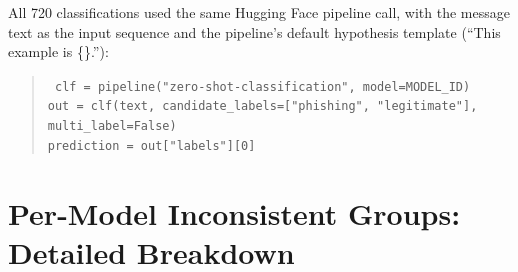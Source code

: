 \documentclass[11pt]{article}
\begin{document}
All 720 classifications used the same Hugging Face pipeline call, with the message text as the input sequence and the pipeline's default hypothesis template (``This example is \{\}.''):

\begin{quote}
\small\tt
clf = pipeline("zero-shot-classification", model=MODEL\_ID)\\[2pt]
out = clf(text, candidate\_labels=["phishing", "legitimate"], multi\_label=False)\\[2pt]
prediction = out["labels"][0]
\end{quote}

\section{Per-Model Inconsistent Groups: Detailed Breakdown}
\label{app:inconsistent}
\end{document}
